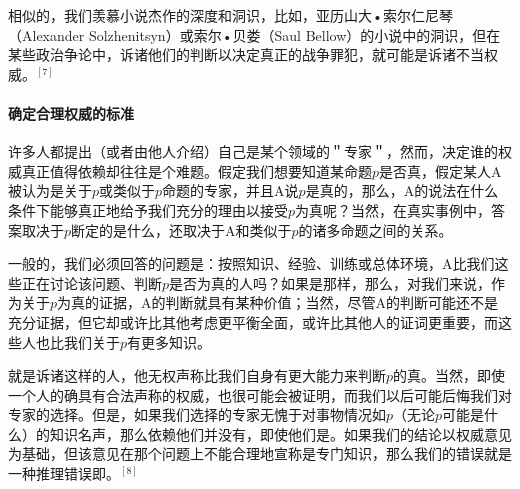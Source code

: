 相似的，我们羡慕小说杰作的深度和洞识，比如，亚历山大•索尔仁尼琴（Alexander Solzhenitsyn）或索尔•贝娄（Saul Bellow）的小说中的洞识，但在某些政治争论中，诉诸他们的判断以决定真正的战争罪犯，就可能是诉诸不当权威。${ }^{[7]}$

\paragraph{确定合理权威的标准}
许多人都提出（或者由他人介绍）自己是某个领域的＂专家＂，然而，决定谁的权威真正值得依赖却往往是个难题。假定我们想要知道某命题$p$是否真，假定某人A被认为是关于$p$或类似于$p$命题的专家，并且A说$p$是真的，那么，A的说法在什么条件下能够真正地给予我们充分的理由以接受$p$为真呢？当然，在真实事例中，答案取决于$p$断定的是什么，还取决于A和类似于$p$的诸多命题之间的关系。

\begin{theorembox}[title=确定合理权威的标准]
一般的，我们必须回答的问题是：按照知识、经验、训练或总体环境，A比我们这些正在讨论该问题、判断$p$是否为真的人吗？如果是那样，那么，对我们来说，作为关于$p$为真的证据，A的判断就具有某种价值；当然，尽管A的判断可能还不是充分证据，但它却或许比其他考虑更平衡全面，或许比其他人的证词更重要，而这些人也比我们关于$p$有更多知识。
\end{theorembox}

就是诉诸这样的人，他无权声称比我们自身有更大能力来判断$p$的真。当然，即使一个人的确具有合法声称的权威，也很可能会被证明，而我们以后可能后悔我们对专家的选择。但是，如果我们选择的专家无愧于对事物情况如$p$（无论$p$可能是什么）的知识名声，那么依赖他们并没有，即使他们是。如果我们的结论以权威意见为基础，但该意见在那个问题上不能合理地宣称是专门知识，那么我们的错误就是一种推理错误即。${ }^{[8]}$